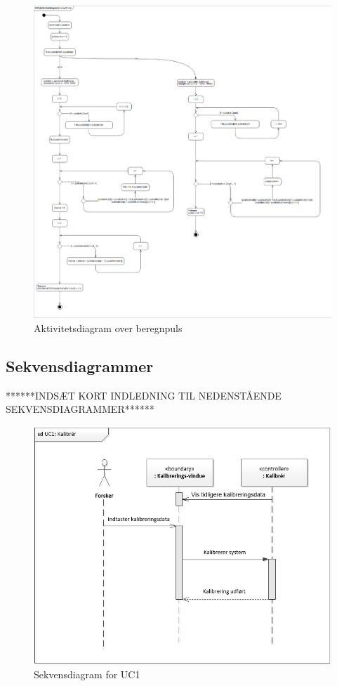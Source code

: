 \begin{figure}[H]
	\centering
	\includegraphics[width=1\textwidth]{Figurer/aktivitetsdiagram_beregnPuls}
	\caption{Aktivitetsdiagram over beregnpuls}
\end{figure}


\subsection{Sekvensdiagrammer}
******INDSÆT KORT INDLEDNING TIL NEDENSTÅENDE SEKVENSDIAGRAMMER******

\begin{figure}[H]
	\centering
	\includegraphics[width=1\textwidth]{Figurer/UC1_SD}
	\caption{Sekvensdiagram for UC1}
\end{figure}

